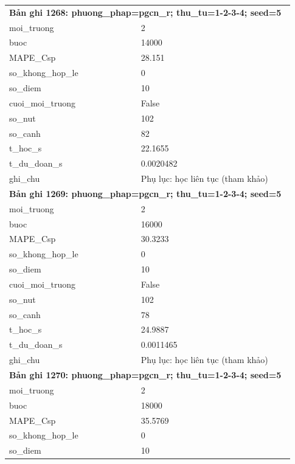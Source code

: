 \begin{longtable}{p{0.43\linewidth}p{0.50\linewidth}}
\midrule
\multicolumn{2}{p{0.95\linewidth}}{\textbf{Bản ghi 1268: phuong\_phap=pgcn\_r; thu\_tu=1-2-3-4; seed=5}} \\
moi\_\allowbreak truong & 2 \\
buoc & 14000 \\
MAPE\_\allowbreak Csp & 28.151 \\
so\_\allowbreak khong\_\allowbreak hop\_\allowbreak le & 0 \\
so\_\allowbreak diem & 10 \\
cuoi\_\allowbreak moi\_\allowbreak truong & False \\
so\_\allowbreak nut & 102 \\
so\_\allowbreak canh & 82 \\
t\_\allowbreak hoc\_\allowbreak s & 22.1655 \\
t\_\allowbreak du\_\allowbreak doan\_\allowbreak s & 0.0020482 \\
ghi\_\allowbreak chu & Phụ lục: học liên tục (tham khảo) \\
\midrule
\multicolumn{2}{p{0.95\linewidth}}{\textbf{Bản ghi 1269: phuong\_phap=pgcn\_r; thu\_tu=1-2-3-4; seed=5}} \\
moi\_\allowbreak truong & 2 \\
buoc & 16000 \\
MAPE\_\allowbreak Csp & 30.3233 \\
so\_\allowbreak khong\_\allowbreak hop\_\allowbreak le & 0 \\
so\_\allowbreak diem & 10 \\
cuoi\_\allowbreak moi\_\allowbreak truong & False \\
so\_\allowbreak nut & 102 \\
so\_\allowbreak canh & 78 \\
t\_\allowbreak hoc\_\allowbreak s & 24.9887 \\
t\_\allowbreak du\_\allowbreak doan\_\allowbreak s & 0.0011465 \\
ghi\_\allowbreak chu & Phụ lục: học liên tục (tham khảo) \\
\midrule
\multicolumn{2}{p{0.95\linewidth}}{\textbf{Bản ghi 1270: phuong\_phap=pgcn\_r; thu\_tu=1-2-3-4; seed=5}} \\
moi\_\allowbreak truong & 2 \\
buoc & 18000 \\
MAPE\_\allowbreak Csp & 35.5769 \\
so\_\allowbreak khong\_\allowbreak hop\_\allowbreak le & 0 \\
so\_\allowbreak diem & 10 \\

\end{longtable}

